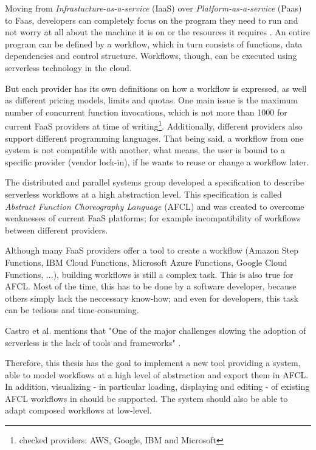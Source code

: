 \documentclass[a4paper,12pt,pdftex,halfparskip,cleardoubleempty,bibtotoc,liststotoc]{scrbook}
\begin{document}
Moving from \emph{Infrastucture-as-a-service} (IaaS) over \emph{Platform-as-a-service} (Paas) to Faas, developers can completely focus on the program they need to run and not worry at all about the machine it is on or the resources it requires \cite{articles-going-serverless-savage}.
An entire program can be defined by a workflow, which in turn consists of functions, data dependencies and control structure. Workflows, though, can be executed using serverless technology in the cloud.

But each provider has its own definitions on how a workflow is expressed, as well as different pricing models, limits and quotas. One main issue is the maximum number of concurrent function invocations, which is not more than 1000  for current FaaS providers at time of writing\footnote{checked providers: AWS, Google, IBM and Microsoft}.
Additionally, different providers also support different programming languages. That being said, a workflow from one system is not compatible with another, what means, the user is bound to a specific provider (vendor lock-in), if he wants to reuse or change a workflow later.

\newpage

The distributed and parallel systems group developed a specification to describe serverless workflows at a high abstraction level. This specification is called \emph{Abstract Function Choreography Language} (AFCL) and was created to overcome weaknesses  of current FaaS platforms; for example incompatibility of workflows between different providers.

Although many FaaS providers offer a tool to create a workflow (Amazon Step Functions, IBM Cloud Functions, Microsoft Azure Functions, Google Cloud Functions, ...), building workflows is still a complex task. This is also true for AFCL. Most of the time, this has to be done by a software developer, because others simply lack the neccessary know-how; and even for developers, this task can be tedious and time-consuming.

Castro et al. mentions that "One of the major challenges slowing the adoption of serverless is the lack of tools and frameworks" \cite{articles-rise-of-serverless-castro}. 

Therefore, this thesis has the goal to implement a new tool providing a system, able to model workflows at a high level of abstraction and export them in AFCL. In addition, visualizing - in particular loading, displaying and editing - of existing AFCL workflows in should be supported.
The system should also be able to adapt composed workflows at low-level.
\end{document}
